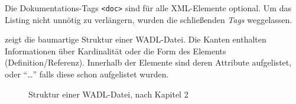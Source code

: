 Die Dokumentations-Tags \texttt{<doc>} sind für alle \gls{XML}-Elemente optional.
Um das Listing nicht unnötig zu verlängern, wurden die schließenden \emph{Tags} weggelassen.

 zeigt die baumartige Struktur einer \gls{WADL}-Datei. Die Kanten enthalten Informationen über Kardinalität oder die Form des Elements (Definition/Referenz). Innerhalb der Elemente sind deren Attribute aufgelistet, oder \enquote{\ldots} falls diese schon aufgelistet wurden.

\newpage

\begin{figure}
    \centering
    \resizebox{!}{1.1\textwidth}{
        
    }
    \caption{Struktur einer \gls{WADL}-Datei, nach Kapitel 2 \cite{hadleyWADL}}
    \label{fig:wadlstructure}
\end{figure}